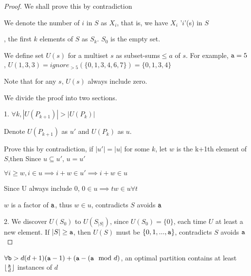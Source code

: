 \begin{proof}

We shall prove this by contradiction

We denote the number of $i$ in $S$ as $X_i$, that is, we have $X_i$ '$i$'(s) in $S$

, the first $k$ elements of $S$ as $S_k$. $S_0$ is the empty set.

We define set $U(s)$ for a multiset $s$ as subset-sums$\leq a$ of $s$. For example, $\mathtt{a}=5$, $U({1,3,3})=ignore_{>5}(\{ 0,1,3,4,6,7\})=\{ 0,1,3,4\}$

Note that for any $s$, $U(s)$ always include zero.

We divide the proof into two sections.

1. $\forall k, |U(P_{k+1})|>|U(P_k)| $ 

Denote $U(P_{k+1})$ as $u'$ and $U(P_k)$ as $u$.

Prove this by contradiction, if $|u'|=|u|$ for some $k$, let $w$ is the k+1th element of $S$,then 
Since $u\subseteq u'$, $u=u'$

$\forall i\geq w, i \in u \implies i+w\in u' \implies i+w\in u$

Since U always include 0, $0\in u \implies tw\in u \forall t$

$w$ is a factor of $\mathtt{a}$, thus $w\in u$, contradicts $S$ avoids $\mathtt{a}$

2. We discover $U(S_0)$ to $U(S_{|S|})$, since $U(S_0)=\{0\}$, each time
$U$ at least a new element. If $|S|\geq \mathtt{a}$, then $U(S)$
must be $\{0,1,...,\mathtt{a}\}$, contradicts $S$ avoids $\mathtt{a}$


\end{proof}

\begin{theorem} 
$\forall \mathtt{b}>d(d+1)(\mathtt{a}-1)  + (\mathtt{a} - (\mathtt{a}\mod d)$, an optimal partition contains at least $\lfloor{\frac{\mathtt{a}}{d}}\rfloor$ instances of $d$
\end{theorem}

